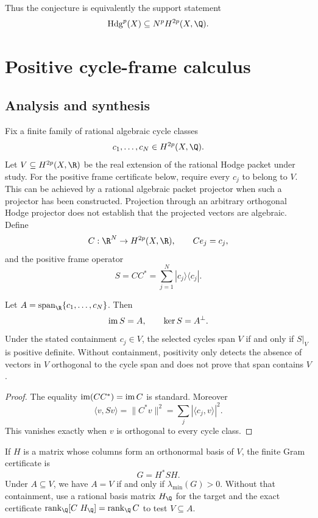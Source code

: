 Thus the conjecture is equivalently the support statement
\[
\Hdg^p(X)\subseteq N^pH^{2p}(X,\Q).
\]




\chapter{Positive cycle-frame calculus}
\section{Analysis and synthesis}
Fix a finite family of rational algebraic cycle classes
\[
c_1,\ldots,c_N\in H^{2p}(X,\Q).
\]
Let $V\subseteq H^{2p}(X,\R)$ be the real extension of the rational Hodge packet under study. For the positive frame certificate below, require every $c_j$ to belong to $V$. This can be achieved by a rational algebraic packet projector when such a projector has been constructed. Projection through an arbitrary orthogonal Hodge projector does not establish that the projected vectors are algebraic. Define
\[
C:\R^N\to H^{2p}(X,\R),
\qquad Ce_j=c_j,
\]
and the positive frame operator
\[
S=CC^*=\sum_{j=1}^N|c_j\rangle\langle c_j|.
\]

\begin{theorem}
Let $A=\Span_{\R}\{c_1,\ldots,c_N\}$. Then
\[
\operatorname{im} S=A,
\qquad
\ker S=A^\perp.
\]
Under the stated containment $c_j\in V$, the selected cycles span $V$ if and only if $S|_V$ is positive definite. Without containment, positivity only detects the absence of vectors in $V$ orthogonal to the cycle span and does not prove that span contains $V$.
\end{theorem}
\begin{proof}
The equality $\operatorname{im}(CC^*)=\operatorname{im} C$ is standard. Moreover
\[
\langle v,Sv\rangle=\|C^*v\|^2=\sum_j|\langle c_j,v\rangle|^2.
\]
This vanishes exactly when $v$ is orthogonal to every cycle class.
\end{proof}

If $H$ is a matrix whose columns form an orthonormal basis of $V$, the finite Gram certificate is
\[
G=H^*SH.
\]
Under $A\subseteq V$, we have $A=V$ if and only if $\lambda_{\min}(G)>0$. Without that containment, use a rational basis matrix $H_{\Q}$ for the target and the exact certificate $\operatorname{rank}_{\Q}[C\ H_{\Q}]=\operatorname{rank}_{\Q}C$ to test $V\subseteq A$.

